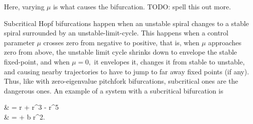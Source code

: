 \documentclass{article}
\begin{document}
Here, varying $\mu$ is what causes the bifurcation. TODO: spell this out more.

Subcritical Hopf bifurcations happen when an unstable spiral changes to a stable spiral surrounded by an \@{unstable-limit-cycle}. This happens when a control parameter $\mu$ crosses zero from negative to positive, that is, when $\mu$ approaches zero from above, the unstable limit cycle shrinks down to envelope the stable \@{fixed-point}, and when $\mu = 0,$ it envelopes it, changes it from stable to unstable, and causing nearby \@{trajectories} to have to jump to far away fixed points (if any). Thus, like with zero-eigenvalue pitchfork bifurcations, subcritical ones are the dangerous ones. An example of a system with a subcritical bifurcation is

\bal
{} & = \mu r + r^3 - r^5 \\
\dot{\theta} & = \omega + b r^2.
\eal
\end{document}
